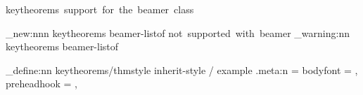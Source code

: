   {keytheorems~support~for~the~beamer~class}

\msg_new:nnn { keytheorems } { beamer-listof }
  {
    \protect\listofkeytheorems\space not~supported~with~beamer
  }
\RenewDocumentCommand {}
  {
    \msg_warning:nn { keytheorems } { beamer-listof }
  }


\keys_define:nn { keytheorems/thmstyle }
  {
    inherit-style / example .meta:n =
      {
        bodyfont    = \normalfont,
        preheadhook = \def\inserttheoremblockenv{exampleblock},
      }
  }

